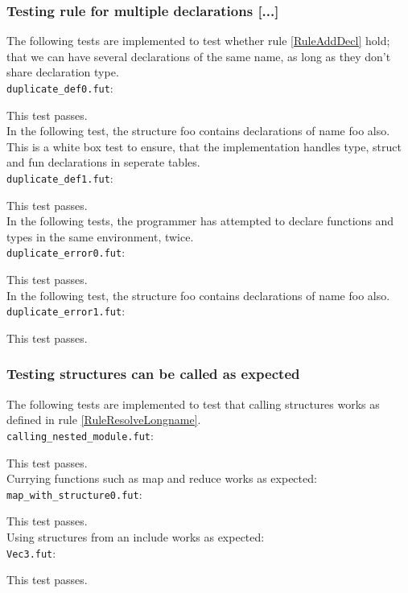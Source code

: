 \subsubsection{Testing rule for multiple declarations [...]}
The following tests are implemented to test whether rule \ref{RuleAddDecl} hold; that we can have several declarations of the same name, as long as they don't share declaration type.\\
\texttt{duplicate\_def0.fut}:

This test passes.
\\
In the following test, the structure foo contains declarations of name foo also.
This is a white box test to ensure, that the implementation handles type, struct
and fun declarations in seperate tables.
\\
\texttt{duplicate\_def1.fut}:

This test passes.
\\
In the following tests, the programmer has attempted to declare functions and
types in the same environment, twice.
\\
\texttt{duplicate\_error0.fut}:

This test passes.
\\
In the following test, the structure foo contains declarations of name foo also.
\\
\texttt{duplicate\_error1.fut}:

This test passes.

\subsubsection{Testing structures can be called as expected}
The following tests are implemented to test that calling structures works as
defined in rule \ref{RuleResolveLongname}.
\\
\texttt{calling\_nested\_module.fut}:

This test passes.
\\
Currying functions such as map and reduce works as expected:
\\
\texttt{map\_with\_structure0.fut}:

This test passes.
\\
Using structures from an include works as expected:
\\
\texttt{Vec3.fut}:


This test passes.
\clearpage

